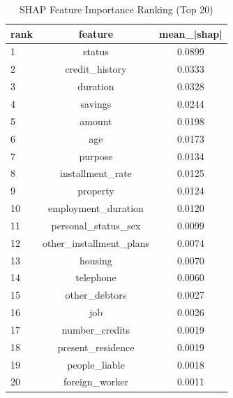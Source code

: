 \begin{table}
\centering
\caption{SHAP Feature Importance Ranking (Top 20)}
\label{tab:shap_ranking}
\begin{tabular}{lcc}
\toprule
rank & feature & mean_|shap| \\
\midrule
1 & status & 0.0899 \\
2 & credit_history & 0.0333 \\
3 & duration & 0.0328 \\
4 & savings & 0.0244 \\
5 & amount & 0.0198 \\
6 & age & 0.0173 \\
7 & purpose & 0.0134 \\
8 & installment_rate & 0.0125 \\
9 & property & 0.0124 \\
10 & employment_duration & 0.0120 \\
11 & personal_status_sex & 0.0099 \\
12 & other_installment_plans & 0.0074 \\
13 & housing & 0.0070 \\
14 & telephone & 0.0060 \\
15 & other_debtors & 0.0027 \\
16 & job & 0.0026 \\
17 & number_credits & 0.0019 \\
18 & present_residence & 0.0019 \\
19 & people_liable & 0.0018 \\
20 & foreign_worker & 0.0011 \\
\bottomrule
\end{tabular}
\end{table}
